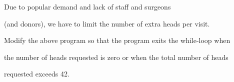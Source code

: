 Due to popular demand and lack of staff and surgeons

(and donors), we have to limit the number of extra heads per visit.

Modify the above program so that the program exits the while-loop when

the number of heads requested is zero or when the total number of heads

requested exceeds 42.

